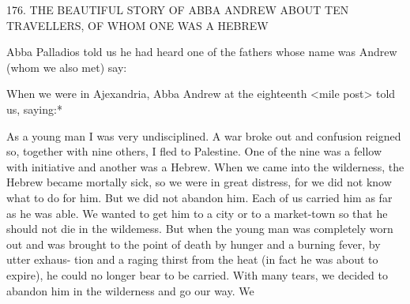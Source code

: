 176. THE BEAUTIFUL STORY OF ABBA ANDREW
ABOUT TEN TRAVELLERS,
OF WHOM ONE WAS A HEBREW

Abba Palladios told us he had heard one of the fathers whose name
was Andrew (whom we also met) say:

When we were in Ajexandria, Abba Andrew at the eighteenth <mile
post> told us, saying:*

As a young man I was very undisciplined. A war broke out and
confusion reigned so, together with nine others, I fled to Palestine.
One of the nine was a fellow with initiative and another was a
Hebrew. When we came into the wilderness, the Hebrew became
mortally sick, so we were in great distress, for we did not know
what to do for him. But we did not abandon him. Each of us
carried him as far as he was able. We wanted to get him to a city
or to a market-town so that he should not die in the wildemess. But
when the young man was completely worn out and was brought to
the point of death by hunger and a burning fever, by utter exhaus-
tion and a raging thirst from the heat (in fact he was about to
expire), he could no longer bear to be carried. With many tears, we
decided to abandon him in the wilderness and go our way. We

